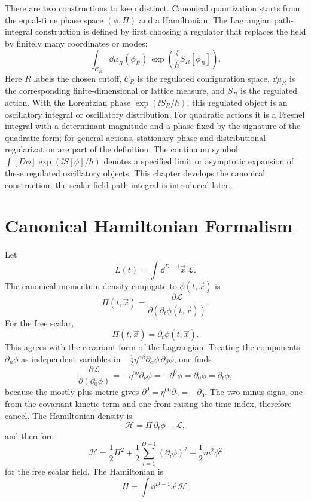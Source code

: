 There are two constructions to keep distinct. Canonical quantization starts
from the equal-time phase space \((\phi,\Pi)\) and a Hamiltonian. The
Lagrangian path-integral construction is defined by first choosing a regulator
that replaces the field by finitely many coordinates or modes:
\[
  \int_{\mathcal C_R}\dd\mu_R(\phi_R)\,
  \exp\left(\frac{\ii}{\hbar}S_R[\phi_R]\right).
\]
Here \(R\) labels the chosen cutoff, \(\mathcal C_R\) is the regulated
configuration space, \(\dd\mu_R\) is the corresponding finite-dimensional or
lattice measure, and \(S_R\) is the regulated action.  With the Lorentzian
phase \(\exp(\ii S_R/\hbar)\), this regulated object is an oscillatory
integral or oscillatory distribution.  For quadratic actions it is a Fresnel
integral with a determinant magnitude and a phase fixed by the signature of the
quadratic form; for general actions, stationary phase and distributional
regularization are part of the definition.  The continuum symbol
\(\int[D\phi]\exp(\ii S[\phi]/\hbar)\) denotes a specified limit or asymptotic
expansion of these regulated oscillatory objects. This chapter develops the
canonical construction; the scalar field path integral is introduced later.

\section{Canonical Hamiltonian Formalism}

\begin{construction}
Let
\[
  L(t)=\int\dd^{D-1}\vec x\,\mathcal L.
\]
The canonical momentum density conjugate to \(\phi(t,\vec x)\) is
\[
  \Pi(t,\vec x)
  =
  \frac{\partial\mathcal L}
       {\partial(\partial_t\phi(t,\vec x))}.
\]
For the free scalar,
\[
  \Pi(t,\vec x)=\partial_t\phi(t,\vec x).
\]
This agrees with the covariant form of the Lagrangian.  Treating the
components \(\partial_\mu\phi\) as independent variables in
\(-\frac12\eta^{\alpha\beta}\partial_\alpha\phi\,\partial_\beta\phi\), one
finds
\[
  \frac{\partial\mathcal L}{\partial(\partial_0\phi)}
  =
  -\eta^{0\nu}\partial_\nu\phi
  =
  -\partial^0\phi
  =
  \partial_0\phi
  =
  \partial_t\phi ,
\]
because the mostly-plus metric gives
\(\partial^0=\eta^{00}\partial_0=-\partial_0\).  The two minus signs,
one from the covariant kinetic term and one from raising the time index,
therefore cancel.
The Hamiltonian density is
\[
  \mathcal H
  =
  \Pi\,\partial_t\phi-\mathcal L,
\]
and therefore
\[
  \mathcal H
  =
  \frac12\Pi^2
  +
  \frac12\sum_{i=1}^{D-1}(\partial_i\phi)^2
  +
  \frac12m^2\phi^2
\]
for the free scalar field. The Hamiltonian is
\[
  H=\int\dd^{D-1}\vec x\,\mathcal H.
\]
\end{construction}

